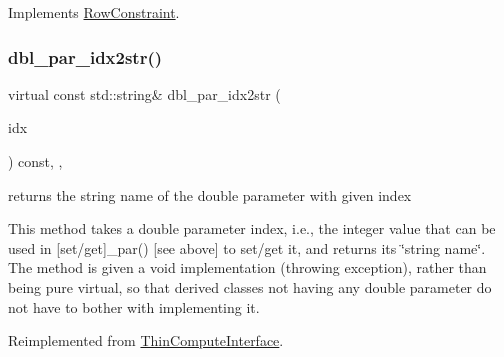 Implements \mbox{\hyperlink{class_s_m_spp__di__unipi__it_1_1_row_constraint_a504d4e3e174c7a518cc66156a8a45ce5}{Row\+Constraint}}.

\mbox{\label{class_s_m_spp__di__unipi__it_1_1_f_row_constraint_a93f1297e7910e91cc18b303376191026}} 
\subsubsection{\texorpdfstring{dbl\+\_\+par\+\_\+idx2str()}{dbl\_par\_idx2str()}}
{\footnotesize\ttfamily virtual const std\+::string\& dbl\+\_\+par\+\_\+idx2str (\begin{DoxyParamCaption}\item[{const \mbox{\hyperlink{class_s_m_spp__di__unipi__it_1_1_thin_compute_interface_aa3d710629ad8c434286726ad810c3b47}{idx\+\_\+type}}}]{idx }\end{DoxyParamCaption}) const\hspace{0.3cm}{\ttfamily [inline]}, {\ttfamily [override]}, {\ttfamily [virtual]}}



returns the string name of the double parameter with given index 

This method takes a double parameter index, i.\+e., the integer value that can be used in \mbox{[}set/get\mbox{]}\+\_\+par() \mbox{[}see above\mbox{]} to set/get it, and returns its \char`\"{}string name\char`\"{}. The method is given a void implementation (throwing exception), rather than being pure virtual, so that derived classes not having any double parameter do not have to bother with implementing it. 

Reimplemented from \mbox{\hyperlink{class_s_m_spp__di__unipi__it_1_1_thin_compute_interface_a1be0e4ca13f9253674bc4fa7b67fe40e}{Thin\+Compute\+Interface}}.

\mbox{\label{class_s_m_spp__di__unipi__it_1_1_f_row_constraint_a6d353ac3d1200d9bea89235da61bc4f3}} 
